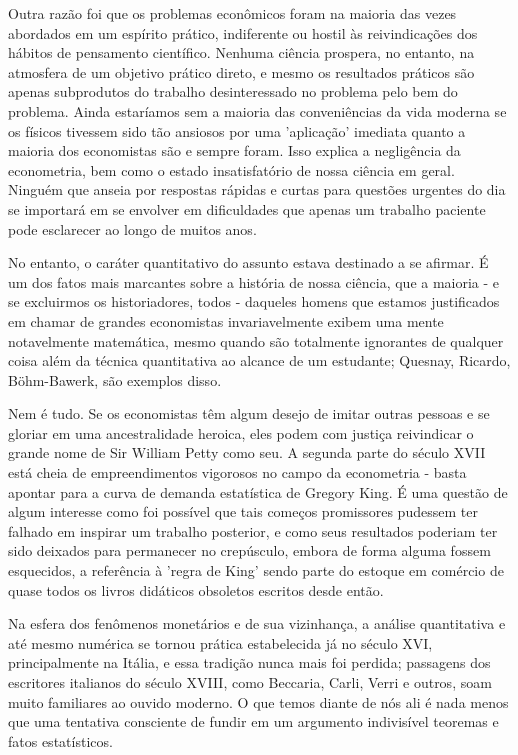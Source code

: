 \documentclass[12pt]{article}
\begin{document}
Outra razão foi que os problemas econômicos foram na maioria das vezes abordados em um espírito prático, indiferente ou hostil às reivindicações dos hábitos de pensamento científico. Nenhuma ciência prospera, no entanto, na atmosfera de um objetivo prático direto, e mesmo os resultados práticos são apenas subprodutos do trabalho desinteressado no problema pelo bem do problema. Ainda estaríamos sem a maioria das conveniências da vida moderna se os físicos tivessem sido tão ansiosos por uma 'aplicação' imediata quanto a maioria dos economistas são e sempre foram. Isso explica a negligência da econometria, bem como o estado insatisfatório de nossa ciência em geral. Ninguém que anseia por respostas rápidas e curtas para questões urgentes do dia se importará em se envolver em dificuldades que apenas um trabalho paciente pode esclarecer ao longo de muitos anos.

No entanto, o caráter quantitativo do assunto estava destinado a se afirmar. É um dos fatos mais marcantes sobre a história de nossa ciência, que a maioria - e se excluirmos os historiadores, todos - daqueles homens que estamos justificados em chamar de grandes economistas invariavelmente exibem uma mente notavelmente matemática, mesmo quando são totalmente ignorantes de qualquer coisa além da técnica quantitativa ao alcance de um estudante; Quesnay, Ricardo, Böhm-Bawerk, são exemplos disso.

Nem é tudo. Se os economistas têm algum desejo de imitar outras pessoas e se gloriar em uma ancestralidade heroica, eles podem com justiça reivindicar o grande nome de Sir William Petty como seu. A segunda parte do século XVII está cheia de empreendimentos vigorosos no campo da econometria - basta apontar para a curva de demanda estatística de Gregory King. É uma questão de algum interesse como foi possível que tais começos promissores pudessem ter falhado em inspirar um trabalho posterior, e como seus resultados poderiam ter sido deixados para permanecer no crepúsculo, embora de forma alguma fossem esquecidos, a referência à 'regra de King' sendo parte do estoque em comércio de quase todos os livros didáticos obsoletos escritos desde então.

Na esfera dos fenômenos monetários e de sua vizinhança, a análise quantitativa e até mesmo numérica se tornou prática estabelecida já no século XVI, principalmente na Itália, e essa tradição nunca mais foi perdida; passagens dos escritores italianos do século XVIII, como Beccaria, Carli, Verri e outros, soam muito familiares ao ouvido moderno. O que temos diante de nós ali é nada menos que uma tentativa consciente de fundir em um argumento indivisível teoremas e fatos estatísticos.
\end{document}
